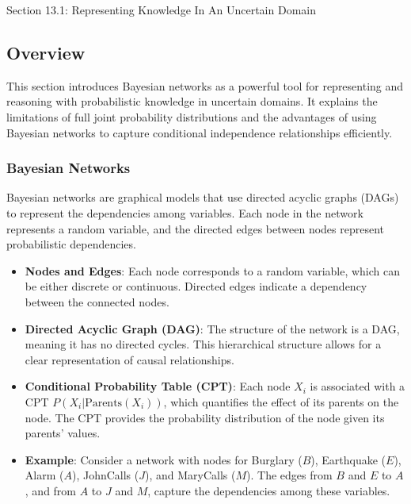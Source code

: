 \begin{notes}{Section 13.1: Representing Knowledge In An Uncertain Domain}
    \subsection*{Overview}

    This section introduces Bayesian networks as a powerful tool for representing and reasoning with probabilistic knowledge in uncertain domains. It explains the limitations of full joint probability 
    distributions and the advantages of using Bayesian networks to capture conditional independence relationships efficiently.
    
    \subsubsection*{Bayesian Networks}
    
    Bayesian networks are graphical models that use directed acyclic graphs (DAGs) to represent the dependencies among variables. Each node in the network represents a random variable, and the directed 
    edges between nodes represent probabilistic dependencies.
    
    \begin{highlight}
    
        \begin{itemize}
            \item \textbf{Nodes and Edges}: Each node corresponds to a random variable, which can be either discrete or continuous. Directed edges indicate a dependency between the connected nodes.
            \item \textbf{Directed Acyclic Graph (DAG)}: The structure of the network is a DAG, meaning it has no directed cycles. This hierarchical structure allows for a clear representation of causal relationships.
            \item \textbf{Conditional Probability Table (CPT)}: Each node $X_i$ is associated with a CPT $P(X_i | \text{Parents}(X_i))$, which quantifies the effect of its parents on the node. The CPT 
            provides the probability distribution of the node given its parents' values.
            \item \textbf{Example}: Consider a network with nodes for Burglary ($B$), Earthquake ($E$), Alarm ($A$), JohnCalls ($J$), and MaryCalls ($M$). The edges from $B$ and $E$ to $A$, 
            and from $A$ to $J$ and $M$, capture the dependencies among these variables.
        \end{itemize}
    

\end{highlight}
\end{notes}
